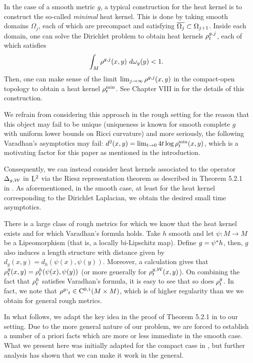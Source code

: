 \documentclass[a4paper, 12pt]{amsart}
\begin{document}
In the case of a smooth metric $g$, a typical construction for
the heat kernel is to construct the so-called \emph{minimal} heat kernel.
This is done by taking smooth domains $\Omega_j$, 
each of which are precompact and satisfying $\overline{\Omega_j} \subset \Omega_{j+1}$. 
Inside each domain, one can solve the Dirichlet problem
to obtain heat kernels $\rho^{g,j}_{t}$, each of which
satisfies 
$$ \int_{M} \hk^{g,j}(x,y)\ d\omega_g(y) < 1.$$
Then, one can make sense of the limit $\lim_{j \to \infty} \rho^{g,j}(x,y)$
in the compact-open topology to obtain a heat kernel $\rho^{\min}_t$.
See Chapter VIII in \cite{Chavel} for the details
of this construction.

We refrain from considering this approach in the rough setting 
for the reason that this object may fail to be unique (uniqueness
is known for smooth complete $g$ with 
uniform lower bounds on Ricci curvature) and more seriously, the following
Varadhan's asymptotics may fail: 
$d^2(x,y) = \lim_{t \to 0} 4t \log \rho^{\min}_t(x,y)$,
which is a motivating factor for this paper as mentioned in the 
introduction.

Consequently, we can instead consider heat kernels
associated to the operator $\Delta_{g,\mathcal{W}}$ in ${\rm L}^{2}_{\rm {}}$
via the Riesz representation theorem as described in Theorem 
5.2.1 in \cite{Davies}. As aforementioned, in the smooth case,
at least for the heat kernel corresponding to the 
Dirichlet Laplacian, we obtain the desired small time
asymptotics. 

There is a large class of rough metrics
for which we know that the heat kernel exists
and for which Varadhan's formula holds. 
Take $h$ smooth and let $\psi:M \to M$
be a Lipeomorphism (that is, a locally bi-Lipschitz map).
Define $g = {\psi}^\ast h$, then, $g$ 
also induces a length structure with 
distance given by $d_g(x,y) = d_h(\psi(x), \psi(y))$.
Moreover, a calculation gives
that $\rho^{g}_t(x,y) = \rho^{h}_t(\psi(x), \psi(y))$
(or more generally for $\rho^{g,\mathcal{W}}_t(x,y)$). 
On combining the fact that $\rho^h_t$ satisfies
Varadhan's formula, it is easy to see that
so does $\rho^{g}_t$. In fact, we 
note that $\rho^g`_t \in {\rm C}^{0,1}_{\rm {}}(M \times M)$,
which is of higher regularity than we we
obtain for general rough metrics.

In what follows, we adapt the key idea in 
the proof of Theorem 5.2.1 in \cite{Davies}
to our setting. Due to the more general 
nature of our problem, we are forced to 
establish a number of a priori facts which 
are more or less immediate in the smooth case.
What we present here was initially adapted for the
compact case in \cite{BRough}, but further analysis
has shown that we can make it work in the general.
\end{document}
